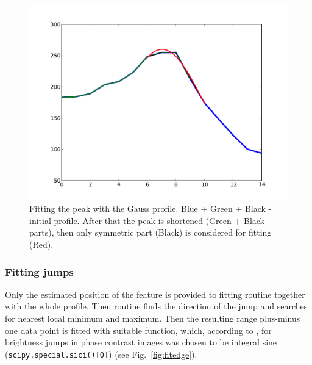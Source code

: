 \begin{figure}%
\includegraphics[width=\columnwidth]{figs/fitpeak.pdf}%
\caption{Fitting the peak with the Gauss profile. Blue + Green + Black - initial profile. After that the peak is shortened (Green + Black parts), then only symmetric part (Black) is considered for fitting (Red).}%
\label{fig:fitpeak}%
\end{figure}

\subsubsection{Fitting jumps}\label{fitjump}
Only the estimated position of the feature is provided to fitting routine together with the whole profile. Then routine finds the direction of the jump and searches for nearest local minimum and maximum. Then the resulting range plus-minus one data point is fitted with suitable function, which,  according to \cite{Bitler1999}, for brightness jumps in phase contrast images was chosen to be integral sine (\verb|scipy.special.sici()[0]|) (see Fig.~\ref{fig:fitedge}).

